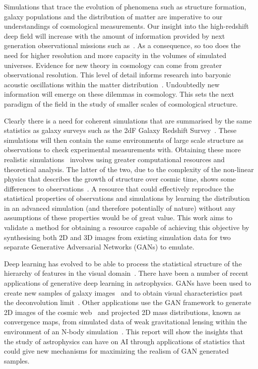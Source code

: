 \documentclass[twocolumn]{article}
\numberwithin{equation}{section}
\begin{document}
Simulations that trace the evolution of phenomena such as structure formation, galaxy populations and the distribution of 
matter are imperative to our understandings of cosmological measurements. Our insight into the high-redshift deep field 
will increase with the amount of information provided by next generation observational missions such 
as~\cite{wfirst_afta, euclid, LSST}. As a consequence, so too does the need for higher resolution and more capacity in 
the volumes of simulated universes. Evidence for new theory in cosmology can come from greater observational resolution. 
This level of detail informs research into baryonic acoustic oscillations within the matter 
distribution~\cite{bao,bao2,bao3}. Undoubtedly new information will emerge on these dilemmas in cosmology. This sets the 
next paradigm of the field in the study of smaller scales of cosmological structure.

Clearly there is a need for coherent simulations that are summarised by the same statistics as galaxy surveys such as 
the 2dF Galaxy Redshift Survey~\cite{2df}. These simulations will then contain the same environments of large scale
structure as observations to check experimental measurements with. Obtaining these more realistic 
simulations~\cite{mill2sim, millxxlsim} involves using greater computational resources and theoretical analysis. The 
latter of the two, due to the complexity of the non-linear physics that describes the growth of structure over cosmic time, 
shows some differences to observations~\cite{mill_diffs}. A resource that could effectively reproduce the statistical 
properties of observations and simulations by learning the distribution in an advanced simulation (and therefore potentially
of nature) without any assumptions of these properties would be of great value. This work aims to validate a method for 
obtaining a resource capable of achieving this objective by synthesising both 2D and 3D images from existing simulation 
data for two separate Generative Adversarial Networks (GANs) to emulate. 

Deep learning has evolved to be able to process the statistical structure of the hierarchy of features in the visual 
domain~\cite{nvidia_gan}. There have been a number of recent applications of generative deep learning in astrophysics. 
GANs have been used to create new samples of galaxy images~\cite{gal_im_gen2} and to obtain visual characteristics past
the deconvolution limit~\cite{gal_im_gen3}. Other applications use the GAN framework to generate 2D images of the cosmic 
web~\cite{web_gan} and projected 2D mass distributions, known as convergence maps, from simulated data of weak 
gravitational lensing within the environment of an N-body simulation~\cite{cosmogan}. This report will show the insights 
that the study of astrophysics can have on AI through applications of statistics that could give new mechanisms for
maximizing the realism of GAN generated samples. 
\end{document}
